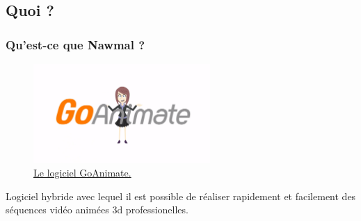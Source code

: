 \subsection{Quoi ?} 
		\begin{frame}
			\frametitle{Qu'est-ce que Nawmal ?}
			\begin{figure}
                     \centering
                     \includegraphics[width = 0.6\textwidth]{goanimate.png}
                     \caption{\tiny{\href{run:goanimate.png}{Le logiciel GoAnimate.}}}
                   \end{figure}
			Logiciel hybride avec lequel  il est possible de réaliser rapidement et facilement des séquences vidéo animées 3d professionelles.
			\end{frame}		
